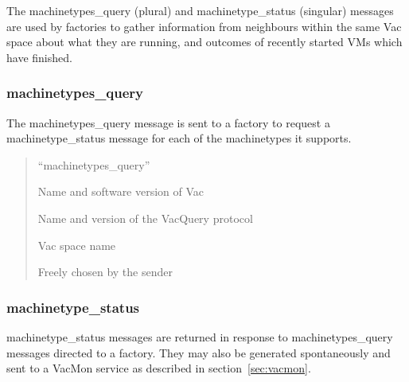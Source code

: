 \documentclass[12pt,a4paper]{article}
\begin{document}
The machinetypes\_query (plural) and machinetype\_status (singular) messages 
are used by factories to gather information from neighbours within the
same Vac space about what they are running, and outcomes of recently started
VMs which have finished.

\subsubsection{machinetypes\_query}
\label{sec:machinetypesquery}

The machinetypes\_query message is sent to a factory to request a 
machinetype\_status message for each of the machinetypes it supports.

\begin{quote}
\begin{description}
\setlength{\parskip}{0pt}
\item[message\_type] ``machinetypes\_query''
\item[vac\_version] Name and software version of Vac
\item[vacquery\_version] Name and version of the VacQuery protocol
\item[space] Vac space name
\item[cookie] Freely chosen by the sender
\end{description}
\end{quote}

\subsubsection{machinetype\_status}
\label{sec:machinetypestatus}

machinetype\_status messages are returned in response to machinetypes\_query 
messages directed to a factory. They may
also be generated spontaneously and sent to a VacMon
service as described in section~\ref{sec:vacmon}.
\end{document}
